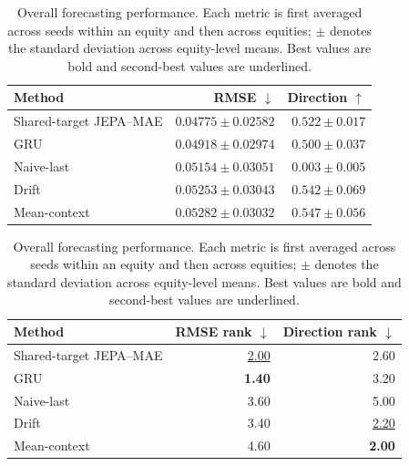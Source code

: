 \begin{table}[t]
\centering
\small
\caption{Overall forecasting performance. Each metric is first averaged across seeds within an equity and then across equities; $\pm$ denotes the standard deviation across equity-level means. Best values are bold and second-best values are underlined.}
\label{tab:main_metrics}
\begin{tabular}{lrr}
\toprule
Method & RMSE $\downarrow$ & Direction $\uparrow$ \\
\midrule
Shared-target JEPA--MAE & \textbf{$0.04775 \pm 0.02582$} & $0.522 \pm 0.017$ \\
GRU & \underline{$0.04918 \pm 0.02974$} & $0.500 \pm 0.037$ \\
Naive-last & $0.05154 \pm 0.03051$ & $0.003 \pm 0.005$ \\
Drift & $0.05253 \pm 0.03043$ & \underline{$0.542 \pm 0.069$} \\
Mean-context & $0.05282 \pm 0.03032$ & \textbf{$0.547 \pm 0.056$} \\
\bottomrule
\end{tabular}
\par\medskip
\begin{tabular}{lrr}
\toprule
Method & RMSE rank $\downarrow$ & Direction rank $\downarrow$ \\
\midrule
Shared-target JEPA--MAE & \underline{2.00} & 2.60 \\
GRU & \textbf{1.40} & 3.20 \\
Naive-last & 3.60 & 5.00 \\
Drift & 3.40 & \underline{2.20} \\
Mean-context & 4.60 & \textbf{2.00} \\
\bottomrule
\end{tabular}
\end{table}
